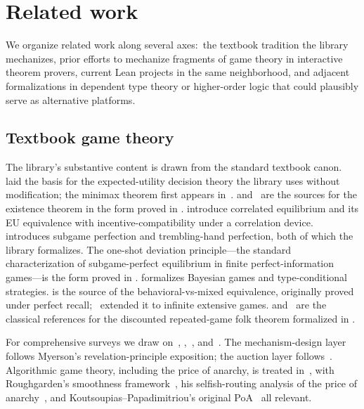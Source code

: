 \section{Related work}
\label{sec:related-work}

We organize related work along several axes:\ the textbook tradition
the library mechanizes, prior efforts to mechanize fragments of
game theory in interactive theorem provers, current Lean projects in
the same neighborhood, and adjacent formalizations in dependent type
theory or higher-order logic that could plausibly serve as alternative
platforms.

\subsection{Textbook game theory}
\label{sec:rw:textbooks}

The library's substantive content is drawn from the standard
textbook canon.  \citet{vNM1944} laid the basis for the
expected-utility decision theory the library uses without
modification; the minimax theorem first appears
in~\citet{vN1928}.  \citet{Nash1950} and~\citet{Nash1951} are the
sources for the existence theorem in the form proved in
.  \citet{Aumann1974, Aumann1987} introduce
correlated equilibrium and its EU equivalence with
incentive-compatibility under a correlation device.
\citet{Selten1965} introduces subgame perfection and
\citet{Selten1975} trembling-hand perfection, both of which the
library formalizes.  The one-shot deviation principle---the
standard characterization of subgame-perfect equilibrium in
finite perfect-information games---is the form proved in
.
\citet{Harsanyi1967} formalizes Bayesian games and
type-conditional strategies.  \citet{Kuhn1953} is the source of
the behavioral-vs-mixed equivalence, originally proved under
perfect recall;~\citet{Aumann1964} extended it to infinite
extensive games.
\citet{Friedman1971} and~\citet{FudenbergMaskin1986} are the
classical references for the discounted repeated-game folk theorem
formalized in .

For comprehensive surveys we draw
on~\citet{OsborneRubinstein1994},
\citet{MaschlerSolanZamir2013},~\citet{ShohamLeytonBrown2008},
and~\citet{Myerson1991}.  The mechanism-design layer follows
Myerson's revelation-principle exposition;
the auction layer follows~\citet{Krishna2010}.  Algorithmic
game theory, including the price of anarchy, is treated
in~\citet{NisanRoughgardenTardosVazirani2007}, with Roughgarden's
smoothness framework~\citep{Roughgarden2015}, his selfish-routing
analysis of the price of anarchy~\citep{Roughgarden2005}, and
Koutsoupias–Papadimitriou's original
PoA~\citep{Koutsoupias1999} all relevant.

